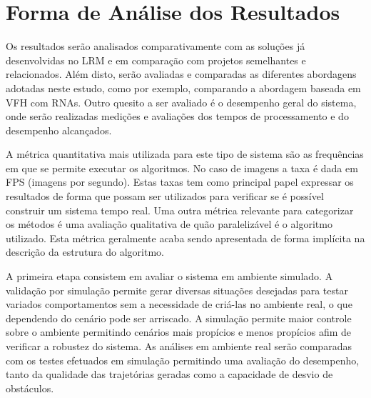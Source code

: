 \section{Forma de Análise dos Resultados}

Os resultados serão analisados comparativamente com as soluções já desenvolvidas
no LRM e em comparação com projetos semelhantes e relacionados. Além disto,
serão avaliadas e comparadas as diferentes abordagens adotadas neste estudo,
como por exemplo, comparando a abordagem baseada em VFH com RNAs. Outro quesito
a ser avaliado é o desempenho geral do sistema, onde serão realizadas medições e
avaliações dos tempos de processamento e do desempenho alcançados.


A métrica quantitativa mais utilizada para este tipo de sistema são as
frequências em que se permite executar os algoritmos. No caso de imagens a taxa
é dada em FPS (imagens por segundo). Estas taxas tem como principal papel
expressar os resultados de forma que possam ser utilizados para verificar se é
possível construir um sistema tempo real. Uma outra métrica relevante para
categorizar os métodos é uma avaliação qualitativa de quão paralelizável é o
algoritmo utilizado. Esta métrica geralmente acaba sendo apresentada de forma
implícita na descrição da estrutura do algoritmo.



A primeira etapa consistem em avaliar o sistema em ambiente simulado. A
validação por simulação permite gerar diversas situações desejadas para testar
variados comportamentos sem a necessidade de criá-las no ambiente real, o que
dependendo do cenário pode ser arriscado. A simulação permite maior controle
sobre o ambiente permitindo cenários mais propícios e menos propícios afim de
verificar a robustez do sistema. As análises em ambiente real serão comparadas
com os testes efetuados em simulação permitindo uma avaliação do desempenho,
tanto da qualidade das trajetórias geradas como a capacidade de desvio de
obstáculos.

